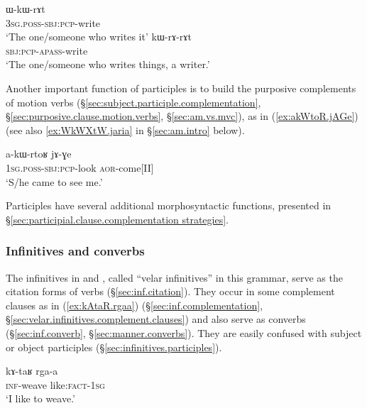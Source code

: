 \begin{exe}
\ex 
\begin{xlist}
\ex \label{ex:WkWrAt.part}
\gll ɯ-kɯ-rɤt \\
\textsc{3sg}.\textsc{poss}-\textsc{sbj}:\textsc{pcp}-write \\
\glt `The one/someone who writes it' 
\ex \label{ex:kWrArAt.part}
\gll kɯ-rɤ-rɤt \\
\textsc{sbj}:\textsc{pcp}-\textsc{apass}-write \\
\glt `The one/someone who writes things, a writer.' 
\end{xlist}
\end{exe}

Another important function of participles is to build the purposive complements of motion verbs (§\ref{sec:subject.participle.complementation}, §\ref{sec:purposive.clause.motion.verbs}, §\ref{sec:am.vs.mvc}), as in  (\ref{ex:akWtoR.jAGe}) (see also \ref{ex:WkWXtW.jaria} in §\ref{sec:am.intro} below).


\begin{exe}
\ex \label{ex:akWtoR.jAGe}
\gll a-kɯ-rtoʁ jɤ-ɣe \\
\textsc{1sg}.\textsc{poss}-\textsc{sbj}:\textsc{pcp}-look \textsc{aor}-come[II] \\
\glt `S/he came to see me.' 
\end{exe}

Participles have several additional morphosyntactic functions, presented in §\ref{sec:participial.clause.complementation strategies}.

\subsubsection{Infinitives and converbs} \label{sec:inf.intro}
  
The infinitives in  and , called ``velar infinitives'' in this grammar, serve as the citation forms of verbs (§\ref{sec:inf.citation}). They occur in some complement clauses as in (\ref{ex:kAtaR.rgaa}) (§\ref{sec:inf.complementation}, §\ref{sec:velar.infinitives.complement.clauses})  and also serve as converbs (§\ref{sec:inf.converb}, §\ref{sec:manner.converbs}). They are easily confused with subject or object participles (§\ref{sec:infinitives.participles}).

\begin{exe}
\ex \label{ex:kAtaR.rgaa}
\gll kɤ-taʁ rga-a \\
\textsc{inf}-weave like:\textsc{fact}-\textsc{1sg} \\
\glt `I like to weave.' 
\end{exe}

